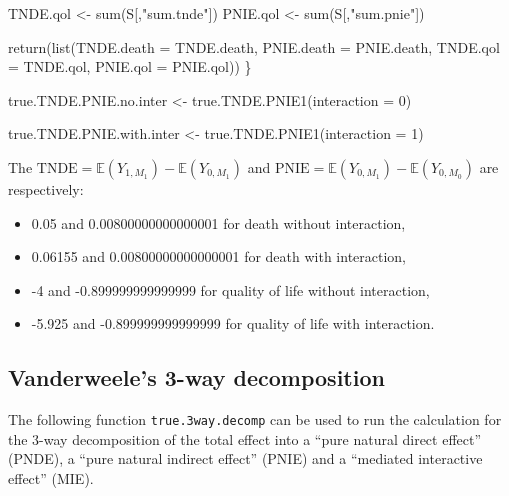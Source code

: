 \documentclass[
]{book}
\newenvironment{Shaded}{\begin{snugshade}}{\end{snugshade}}
\newcommand{\AttributeTok}[1]{\textcolor[rgb]{0.77,0.63,0.00}{#1}}
\newcommand{\DecValTok}[1]{\textcolor[rgb]{0.00,0.00,0.81}{#1}}
\newcommand{\FunctionTok}[1]{\textcolor[rgb]{0.00,0.00,0.00}{#1}}
\newcommand{\NormalTok}[1]{#1}
\newcommand{\OtherTok}[1]{\textcolor[rgb]{0.56,0.35,0.01}{#1}}
\newcommand{\StringTok}[1]{\textcolor[rgb]{0.31,0.60,0.02}{#1}}
\providecommand{\tightlist}{%
  \setlength{\itemsep}{0pt}\setlength{\parskip}{0pt}}
\begin{document}
\begin{Shaded}
\begin{Highlighting}[]
\NormalTok{  TNDE.qol }\OtherTok{\textless{}{-}} \FunctionTok{sum}\NormalTok{(S[,}\StringTok{"sum.tnde"}\NormalTok{])}
\NormalTok{  PNIE.qol }\OtherTok{\textless{}{-}} \FunctionTok{sum}\NormalTok{(S[,}\StringTok{"sum.pnie"}\NormalTok{])}
   
  \FunctionTok{return}\NormalTok{(}\FunctionTok{list}\NormalTok{(}\AttributeTok{TNDE.death =}\NormalTok{ TNDE.death, }\AttributeTok{PNIE.death =}\NormalTok{ PNIE.death, }
              \AttributeTok{TNDE.qol =}\NormalTok{ TNDE.qol, }\AttributeTok{PNIE.qol =}\NormalTok{ PNIE.qol))}
\NormalTok{\}}
\end{Highlighting}
\end{Shaded}

\begin{Shaded}
\begin{Highlighting}[]
\NormalTok{true.TNDE.PNIE.no.inter }\OtherTok{\textless{}{-}} \FunctionTok{true.TNDE.PNIE1}\NormalTok{(}\AttributeTok{interaction =} \DecValTok{0}\NormalTok{)}

\NormalTok{true.TNDE.PNIE.with.inter }\OtherTok{\textless{}{-}} \FunctionTok{true.TNDE.PNIE1}\NormalTok{(}\AttributeTok{interaction =} \DecValTok{1}\NormalTok{)}
\end{Highlighting}
\end{Shaded}

The \(\text{TNDE}=\mathbb{E}\left( Y_{1,M_1}\right) - \mathbb{E}\left(Y_{0,M_1}\right)\) and \(\text{PNIE}=\mathbb{E}\left( Y_{0,M_1}\right) - \mathbb{E}\left(Y_{0,M_0}\right)\) are respectively:

\begin{itemize}
\tightlist
\item
  0.05 and 0.00800000000000001 for death without interaction,
\item
  0.06155 and 0.00800000000000001 for death with interaction,
\item
  -4 and -0.899999999999999 for quality of life without interaction,
\item
  -5.925 and -0.899999999999999 for quality of life with interaction.
\end{itemize}

\hypertarget{vanderweeles-3-way-decomposition}{%
\subsection{Vanderweele's 3-way decomposition}\label{vanderweeles-3-way-decomposition}}

The following function \texttt{true.3way.decomp} can be used to run the calculation for the 3-way decomposition of the total effect into a ``pure natural direct effect'' (PNDE), a ``pure natural indirect effect'' (PNIE) and a ``mediated interactive effect'' (MIE).
\end{document}
